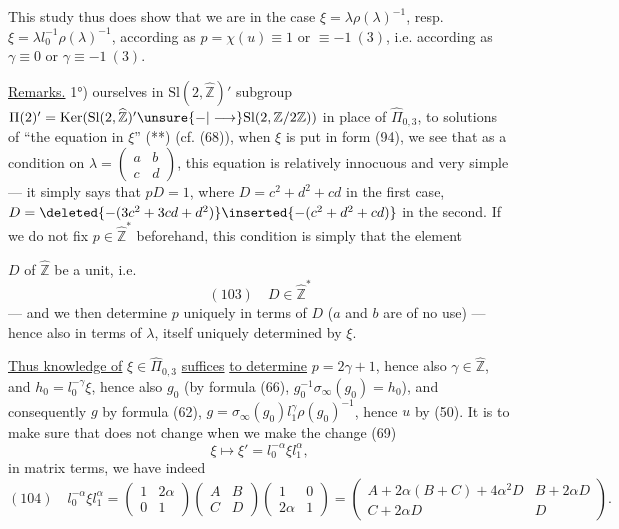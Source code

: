 This study thus does show that we are in the case $\xi=\lambda\rho(\lambda)^{-1}$, resp. $\xi=\lambda l_0^{-1}\rho(\lambda)^{-1}$, according as $p=\chi(u)\equiv1$ or $\equiv-1\ (3)$, i.e. according as $\gamma\equiv0$ or $\gamma\equiv-1\ (3)$.

\uline{Remarks.} 1°)  ourselves in $\mathrm{Sl}(2,\widehat{\mathbb Z})'$    subgroup $\Pi(2)'=\operatorname{Ker}(\mathrm{Sl}(2,\widehat{\mathbb Z})'\unsure{-|\longrightarrow}\mathrm{Sl}(2,\mathbb Z/2\mathbb Z))$ in place of $\widehat{\Pi}_{0,3}$, to   solutions of ``the equation in $\xi$'' (**) (cf. (68)), when $\xi$ is put in  form (94), we see that as a condition on $\lambda=\begin{pmatrix}a&b\\c&d\end{pmatrix}$, this equation is relatively innocuous and very simple --- it simply says that $pD=1$, where $D=c^2+d^2+cd$ in the first case, $D=\deleted{-(3c^2+3cd+d^2)}\inserted{-(c^2+d^2+cd)}$ in the second. If we do not fix $p\in\widehat{\mathbb Z}^{*}$ beforehand, this condition is simply that the element


$D$ of $\widehat{\mathbb Z}$ be a unit, i.e.
\[
(103)\quad D\in\widehat{\mathbb Z}^{*}
\]
--- and we then determine $p$ uniquely in terms of $D$  ($a$ and $b$ are of no use) --- hence also in terms of $\lambda$, itself uniquely determined by $\xi$.

\uline{Thus knowledge of} $\xi\in\widehat{\Pi}_{0,3}$ \uline{suffices} \uline{to determine}  $p=2\gamma+1$, hence also $\gamma\in\widehat{\mathbb Z}$, and $h_0=l_0^{-\gamma}\xi$, hence also $g_0$ (by formula (66), $g_0^{-1}\sigma_\infty(g_0)=h_0$), and consequently $g$ by formula (62), $g=\sigma_\infty(g_0)l_1^\gamma\rho(g_0)^{-1}$, hence $u$ by (50). It is  to make sure that   does not change when we make the change (69)
\[
\xi\longmapsto\xi'=l_0^{-\alpha}\xi l_1^\alpha,
\]
in matrix terms, we have indeed
\[
(104)\quad l_0^{-\alpha}\xi l_1^\alpha=
\begin{pmatrix}1&2\alpha\\0&1\end{pmatrix}
\begin{pmatrix}A&B\\C&D\end{pmatrix}
\begin{pmatrix}1&0\\2\alpha&1\end{pmatrix}
=\begin{pmatrix}A+2\alpha(B+C)+4\alpha^2D&B+2\alpha D\\C+2\alpha D&D\end{pmatrix}.
\]

